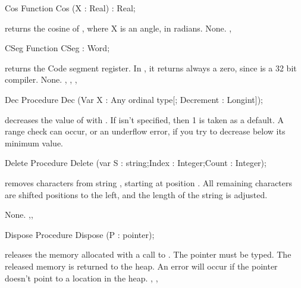 \documentclass{report}
\begin{document}
\html{}
\begin{function}{Cos}
\Declaration
Function Cos (X : Real) : Real;

\Description
{} returns the cosine of , where X is an angle, in radians.
\Errors
None.
\SeeAlso
{}, 
\end{function}
\html{}
\begin{function}{CSeg}
\Declaration
Function CSeg  : Word;

\Description
{} returns the Code segment register. In \fpc, it returns always a
zero, since \fpc is a 32 bit compiler.
\Errors
None.
\SeeAlso
{}, , , 
\end{function}
\html{}
\begin{procedure}{Dec}
\Declaration
Procedure Dec (Var X : Any ordinal type[; Decrement : Longint]);

\Description
{} decreases the value of  with .
If  isn't specified, then 1 is taken as a default.
\Errors
A range check can occur, or an underflow error, if you try to decrease 
below its minimum value.
\SeeAlso
{}
\end{procedure}
\html{}
\begin{procedure}{Delete}
\Declaration
Procedure Delete (var S : string;Index : Integer;Count : Integer);

\Description
{} removes  characters from string , starting
at position . All remaining characters are shifted 
positions to the left, and the length of the string is adjusted.

\Errors
None.
\SeeAlso
{},,
\end{procedure}
\html{}
\begin{procedure}{Dispose}
\Declaration
Procedure Dispose (P : pointer);

\Description
{} releases the memory allocated with a call to .
The pointer  must be typed. The released memory is returned to the
heap.
\Errors
An error will occur if the pointer doesn't point to a location in the
heap.
\SeeAlso
{}, , 
\end{procedure}
\end{document}
